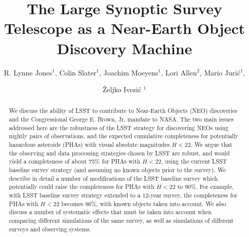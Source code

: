 \documentclass[12pt,preprint]{aastex}
\begin{document}
\title{The Large Synoptic Survey Telescope as a Near-Earth Object Discovery Machine}

\author{R. Lynne Jones$^1$, Colin Slater$^1$, Joachim Moeyens$^1$,
Lori Allen$^2$, Mario Juri\'{c}$^1$,  \and \v{Z}eljko Ivezi\'{c} $^1$}


\begin{abstract}
We discuss the ability of LSST to contribute to Near-Earth Objects (NEO) discoveries and
the Congressional George E. Brown, Jr. mandate to NASA. The two main issues addressed
here are the robustness of the LSST strategy for discovering NEOs using nightly pairs of
observations, and the expected cumulative completeness for potentially hazardous asteroids
(PHAs) with visual absolute magnitudes $H<22$.  We argue that the observing and data
processing strategies chosen by LSST are robust, and would yield a completeness of about
75\% for PHAs with $H<22$, using the current LSST baseline survey strategy (and assuming
no known objects prior to the survey). We describe in detail a number of modifications of the
LSST baseline survey which potentially could raise the completeness for PHAs with $H<22$
to 90\%. For example, with LSST baseline survey strategy extended to a 12-year survey,
the completeness for PHAs with $H<22$ becomes 86\%, with known objects taken into
account. We also discuss a number of systematic effects that must be taken into account
when comparing different simulations of the same survey, as well as simulations of different
surveys and observing systems.
\end{abstract}














\appendix


% 


\end{document}
